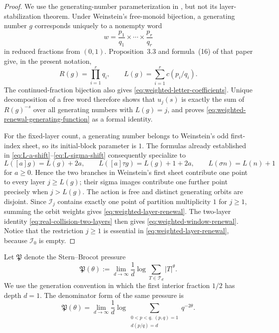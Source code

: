 \begin{proof}
We use the generating-number parameterization in
\cite[Secs.~3--4]{Weinstein2016}, but not its layer-stabilization theorem.
Under Weinstein's free-monoid bijection, a generating number \(g\) corresponds
uniquely to a nonempty word
\[
 w=\frac{p_1}{q_1}\times\cdots\times\frac{p_r}{q_r}
\]
in reduced fractions from \((0,1)\).  Proposition~3.3 and formula~(16) of
that paper give, in the present notation,
\begin{equation}
 R(g)=\prod_{i=1}^r q_i,
 \qquad L(g)=\sum_{i=1}^r c(p_i/q_i).
 \label{eq:generator-weight-length}
\end{equation}
The continued-fraction bijection also gives
\eqref{eq:weighted-letter-coefficients}.  Unique decomposition of a free word
therefore shows that \(u_j(s)\) is exactly the sum of \(R(g)^{-s}\) over all
generating numbers with \(L(g)=j\), and proves
\eqref{eq:weighted-renewal-generating-function} as a formal identity.

For the fixed-layer count, a generating
number belongs to Weinstein's odd first-index sheet, so its initial-block
parameter is \(1\).  The formulas already established in
\eqref{eq:L-a-shift}--\eqref{eq:L-sigma-shift} consequently specialize to
\[
 L([a]g)=L(g)+2a,\qquad
 L([a]\tau g)=L(g)+1+2a,\qquad
 L(\sigma n)=L(n)+1
\]
for \(a\ge0\).  Hence the two branches in Weinstein's first sheet contribute
one point to every layer \(j\ge L(g)\); their sigma images contribute one
further point precisely when \(j>L(g)\).  The action is free and distinct
generating orbits are disjoint.  Since \(\mathcal I_j\) contains exactly one
point of partition multiplicity \(1\) for \(j\ge1\), summing the orbit weights
gives \eqref{eq:weighted-layer-renewal}.  The two-layer identity
\eqref{eq:real-collision-two-layers} then gives
\eqref{eq:weighted-window-renewal}.  Notice that the restriction \(j\ge1\) is
essential in \eqref{eq:weighted-layer-renewal}, because \(\mathcal I_0\) is
empty.
\end{proof}

Let \(\mathfrak P\) denote the Stern--Brocot pressure
\[
 \mathfrak P(\theta)
 :=\lim_{d\to\infty}\frac1d
   \log\sum_{T\in\mathcal T_d}|T|^\theta .
\]
We use the generation convention in which the first interior fraction
\(1/2\) has depth \(d=1\).  The denominator form of the same pressure
\cite[Sec.~2 and Thm.~1.1]{KessebohmerStratmann2007} is
\begin{equation}
 \mathfrak P(\theta)=
 \lim_{d\to\infty}\frac1d\log
 \sum_{\substack{0<p<q,\ (p,q)=1\\d(p/q)=d}}q^{-2\theta}.
 \label{eq:stern-brocot-denominator-convention}
\end{equation}

